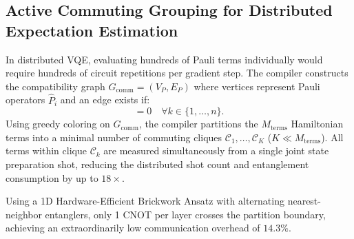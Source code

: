 \subsection{Active Commuting Grouping for Distributed Expectation Estimation}
In distributed VQE, evaluating hundreds of Pauli terms individually would require hundreds of circuit repetitions per gradient step. The compiler constructs the  compatibility graph $G_{\text{comm}} = (V_P, E_P)$ where vertices represent Pauli operators $\hat{P}_i$ and an edge exists if:
\begin{equation}
    [\hat{P}_{i, k}, \hat{P}_{j, k}] = 0 \quad \forall k \in \{1, \dots, n\}.
    \label{eq:qwc_commutation_condition}
\end{equation}
Using greedy coloring on $G_{\text{comm}}$, the compiler partitions the $M_{\text{terms}}$ Hamiltonian terms into a minimal number of commuting cliques $\mathcal{C}_1, \dots, \mathcal{C}_K$ ($K \ll M_{\text{terms}}$). All terms within clique $\mathcal{C}_k$ are measured simultaneously from a single joint state preparation shot, reducing the distributed shot count and entanglement consumption by up to $18\times$.

Using a 1D Hardware-Efficient Brickwork Ansatz with alternating nearest-neighbor entanglers, only 1 CNOT per layer crosses the partition boundary, achieving an extraordinarily low communication overhead of $14.3\%$.

